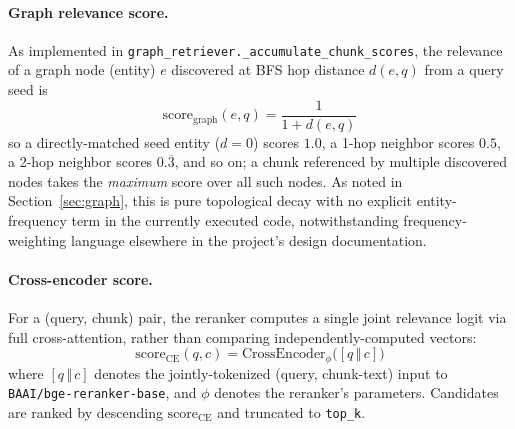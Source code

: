 \documentclass[conference]{IEEEtran}
\begin{document}
\paragraph{Graph relevance score.}
As implemented in \texttt{graph\_retriever.\_accumulate\_chunk\_scores}, the relevance of a graph node (entity) $e$ discovered at BFS hop distance $d(e,q)$ from a query seed is
\begin{equation}
\text{score}_{\text{graph}}(e, q) = \frac{1}{1 + d(e,q)}
\label{eq:graphscore}
\end{equation}
so a directly-matched seed entity ($d=0$) scores $1.0$, a 1-hop neighbor scores $0.5$, a 2-hop neighbor scores $0.\overline{3}$, and so on; a chunk referenced by multiple discovered nodes takes the \emph{maximum} score over all such nodes. As noted in Section~\ref{sec:graph}, this is pure topological decay with no explicit entity-frequency term in the currently executed code, notwithstanding frequency-weighting language elsewhere in the project's design documentation.

\paragraph{Cross-encoder score.}
For a (query, chunk) pair, the reranker computes a single joint relevance logit via full cross-attention, rather than comparing independently-computed vectors:
\begin{equation}
\text{score}_{\text{CE}}(q, c) = \text{CrossEncoder}_\phi\big([q \, \mathbin{\Vert} \, c]\big)
\label{eq:crossencoder}
\end{equation}
where $[q \,\Vert\, c]$ denotes the jointly-tokenized (query, chunk-text) input to \texttt{BAAI/bge-reranker-base}, and $\phi$ denotes the reranker's parameters. Candidates are ranked by descending $\text{score}_{\text{CE}}$ and truncated to \texttt{top\_k}.
\end{document}
